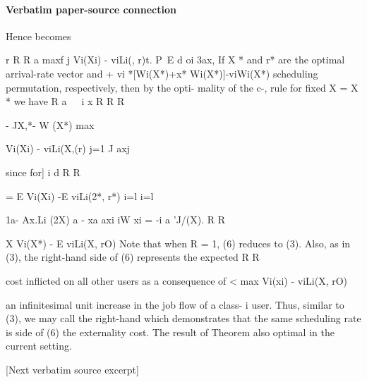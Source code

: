 \documentclass[10pt]{article}
\begin{document}
\paragraph{Verbatim paper-source connection}
\begin{ReviewVerbatim}
Hence                                                                  becomes

                                                                                   r     R   R
            a
                                                                        maxf j Vi(Xi) - viLi(, r)t.
    P~E
     d oi 3ax,
                                                                       If X * and r* are the optimal arrival-rate vector and
      + vi *[Wi(X*)+x* Wi(X*)]-viWi(X*)                                scheduling permutation, respectively, then by the opti-
                                                                       mality of the c-, rule for fixed X = X * we have
           R a~~~i x
      R                                                                             R            R

   - JX,*- W (X*)                                                       max{ Vi(Xi) - viLi(X,(r)
      j=1 J axj

since for] i d                                                                   R           R


                                                                          = E Vi(Xi) -E viLi(2*, r*)
                                                                               i=l       i=l


1a-
 Ax.Li (2X) a - xa
          axi    iW xi
                    = -i a 'J/(X).                                               R           R


                                                                           X Vi(X*) - E viLi(X, rO)
  Note that when R = 1, (6) reduces to (3). Also, as
in (3), the right-hand side of (6) represents the expected                                   R   R

cost inflicted on all other users as a consequence of                      < max Vi(xi) - viLi(X, rO)}
an infinitesimal unit increase in the job flow of a class-
i user. Thus, similar to (3), we may call the right-hand               which demonstrates that the same scheduling rate is
side of (6) the externality cost. The result of Theorem                also optimal in the current setting.

[Next verbatim source excerpt]


\end{ReviewVerbatim}
\end{document}

